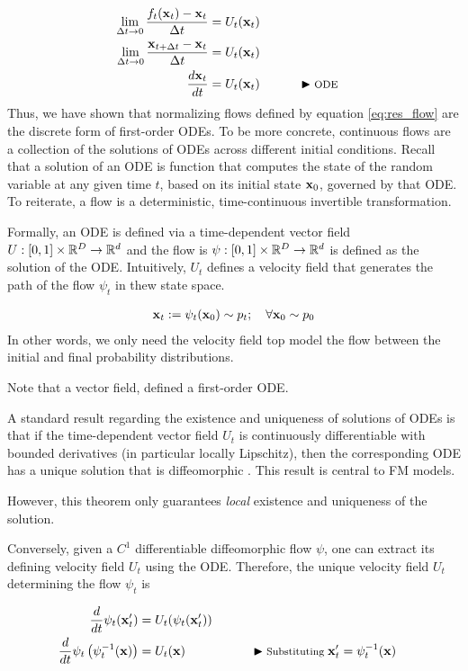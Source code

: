 \documentclass[a4paper, 11pt]{article}
\begin{document}
\begin{align}\label{eq:flow_ode}
    \lim_{\Delta t \to 0} \frac{f_t(\mbox{$\mbox{$\mathbf{x}$}$}_t) - \mbox{$\mbox{$\mathbf{x}$}$}_t}{\Delta t} &= U_t(\mbox{$\mbox{$\mathbf{x}$}$}_t)\\
    \lim_{\Delta t \to 0} \frac{ \mbox{$\mbox{$\mathbf{x}$}$}_{t + \Delta t} - \mbox{$\mbox{$\mathbf{x}$}$}_t}{\Delta t} &= U_t(\mbox{$\mbox{$\mathbf{x}$}$}_t) \\ 
    \frac{d \mbox{$\mbox{$\mathbf{x}$}$}_t}{dt} &= U_t(\mbox{$\mbox{$\mathbf{x}$}$}_t) && \qquad \blacktriangleright\text{\footnotesize ODE}
\end{align}
Thus, we have shown that normalizing flows defined by equation \eqref{eq:res_flow} are the discrete form of first-order ODEs. To be more concrete, continuous flows are a collection of the solutions of ODEs across different initial conditions. Recall that a solution of an ODE is function that computes the state of the random variable at any given time $t$, based on its initial state $\mbox{$\mbox{$\mathbf{x}$}$}_0$, governed by that ODE. To reiterate, a flow is a deterministic, time-continuous invertible transformation.
   

Formally, an ODE is defined via a time-dependent vector field $U:[0, 1] \times \mathbb{R}^D \to \mathbb{R}^d$ and the flow is $\psi:[0,1] \times \mathbb{R}^D \to \mathbb{R}^d$ is defined as the solution of the ODE. Intuitively, $U_t$ defines a velocity field that generates the path of the flow $\psi_t$ in thew state space. 

\begin{align}
    \mbox{$\mbox{$\mathbf{x}$}$}_t := \psi_t(\mbox{$\mbox{$\mathbf{x}$}$}_0) \sim p_t; \quad \forall \mbox{$\mbox{$\mathbf{x}$}$}_0 \sim p_0
\end{align}
In other words, we only need the velocity field top model the flow between the initial and final probability distributions.

Note that a vector field, defined a first-order ODE.

A standard result regarding the existence and uniqueness of solutions of ODEs is that if the time-dependent vector field $U_t$ is continuously differentiable with bounded derivatives (in particular locally Lipschitz), then the corresponding ODE has a unique solution that is diffeomorphic \citep{perko2013differential}. This result is central to FM models. 

However, this theorem only guarantees \textit{local} existence and uniqueness of the solution. 

Conversely, given a $C^1$ differentiable diffeomorphic flow $\psi$, one can extract its defining velocity field $U_t$ using the ODE. Therefore, the unique velocity field $U_t$ determining the flow $\psi_t$ is 

\begin{align}
    \frac{d}{dt}\psi_t(\mbox{$\mbox{$\mathbf{x}$}$}'_t) &= U_t(\psi_t(\mbox{$\mbox{$\mathbf{x}$}$}'_t))\\
    \frac{d}{dt}\psi_t \left (\psi_t^{-1}(\mbox{$\mbox{$\mathbf{x}$}$}) \right) &= U_t(\mbox{$\mbox{$\mathbf{x}$}$}) && \qquad \blacktriangleright\text{\footnotesize Substituting }\mbox{$\mbox{$\mathbf{x}$}$}'_t = \psi_t^{-1}(\mbox{$\mbox{$\mathbf{x}$}$})
\end{align}
\end{document}
